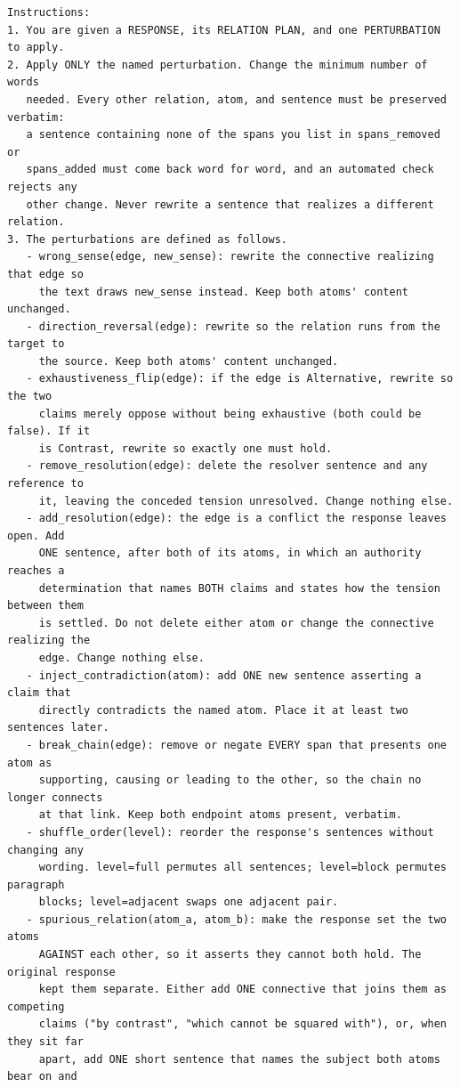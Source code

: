\documentclass[11pt]{article}
\begin{document}
\begin{small}
\begin{verbatim}
Instructions:
1. You are given a RESPONSE, its RELATION PLAN, and one PERTURBATION to apply.
2. Apply ONLY the named perturbation. Change the minimum number of words
   needed. Every other relation, atom, and sentence must be preserved verbatim:
   a sentence containing none of the spans you list in spans_removed or
   spans_added must come back word for word, and an automated check rejects any
   other change. Never rewrite a sentence that realizes a different relation.
3. The perturbations are defined as follows.
   - wrong_sense(edge, new_sense): rewrite the connective realizing that edge so
     the text draws new_sense instead. Keep both atoms' content unchanged.
   - direction_reversal(edge): rewrite so the relation runs from the target to
     the source. Keep both atoms' content unchanged.
   - exhaustiveness_flip(edge): if the edge is Alternative, rewrite so the two
     claims merely oppose without being exhaustive (both could be false). If it
     is Contrast, rewrite so exactly one must hold.
   - remove_resolution(edge): delete the resolver sentence and any reference to
     it, leaving the conceded tension unresolved. Change nothing else.
   - add_resolution(edge): the edge is a conflict the response leaves open. Add
     ONE sentence, after both of its atoms, in which an authority reaches a
     determination that names BOTH claims and states how the tension between them
     is settled. Do not delete either atom or change the connective realizing the
     edge. Change nothing else.
   - inject_contradiction(atom): add ONE new sentence asserting a claim that
     directly contradicts the named atom. Place it at least two sentences later.
   - break_chain(edge): remove or negate EVERY span that presents one atom as
     supporting, causing or leading to the other, so the chain no longer connects
     at that link. Keep both endpoint atoms present, verbatim.
   - shuffle_order(level): reorder the response's sentences without changing any
     wording. level=full permutes all sentences; level=block permutes paragraph
     blocks; level=adjacent swaps one adjacent pair.
   - spurious_relation(atom_a, atom_b): make the response set the two atoms
     AGAINST each other, so it asserts they cannot both hold. The original response
     kept them separate. Either add ONE connective that joins them as competing
     claims ("by contrast", "which cannot be squared with"), or, when they sit far
     apart, add ONE short sentence that names the subject both atoms bear on and

\end{verbatim}
\end{small}
\end{document}
